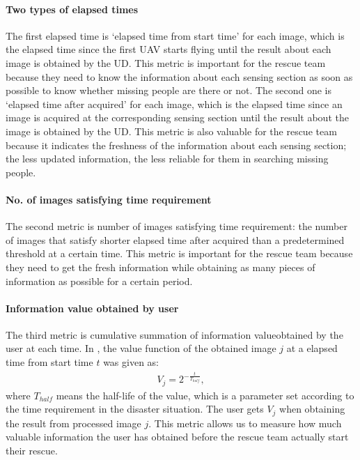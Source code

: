 \documentclass{ieeeaccess}
\begin{document}
\paragraph*{Two types of elapsed times}
The first elapsed time is `elapsed time from start time' for each image, which is the elapsed time since the first UAV starts flying until the result about each image is obtained by the UD.
%
This metric is important for the rescue team because they need to know the information about each sensing section as soon as possible to know whether missing people are there or not.
%
The second one is `elapsed time after acquired' for each image, which is the elapsed time since an image is acquired at the corresponding sensing section until the result about the image is obtained by the UD.
%
This metric is also valuable for the rescue team because it indicates the freshness of the information about each sensing section; the less updated information, the less reliable for them in searching missing people.

\paragraph*{No. of images satisfying time requirement}
The second metric is number of images satisfying time requirement: the number of images that satisfy shorter elapsed time after acquired than a predetermined threshold at a certain time.
This metric is important for the rescue team because they need to get the fresh information while obtaining as many pieces of information as possible for a certain period.

\paragraph*{Information value obtained by user}
The third metric is cumulative summation of information valueobtained by the user at each time.
In \cite{NOMURA2001}, the value function of the obtained image $j$ at a elapsed time from start time $t$ was given as:
\begin{align}
V_j=2^{-\frac{t}{T_{half}}}, \label{eq_value}
\end{align}
where $T_{half}$ means the half-life of the value, which is a parameter set according to the time requirement in the disaster situation.
%
The user gets $V_j$ when obtaining the result from processed image $j$. 
This metric allows us to measure how much valuable information the user has obtained before the rescue team actually start their rescue. 
\end{document}
